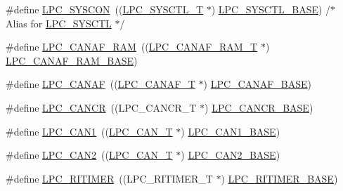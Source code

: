 \begin{DoxyCompactItemize}
\item 
\#define \hyperlink{group__PERIPH__175X__6X__BASE_gabe45c10a979fe812e3d9ecd72fe33a2f}{L\-P\-C\-\_\-\-S\-Y\-S\-C\-O\-N}~((\hyperlink{structLPC__SYSCTL__T}{L\-P\-C\-\_\-\-S\-Y\-S\-C\-T\-L\-\_\-\-T}           $\ast$) \hyperlink{group__PERIPH__407X__8X__BASE_gae4670b50fe27772fa31de1da10bec7b7}{L\-P\-C\-\_\-\-S\-Y\-S\-C\-T\-L\-\_\-\-B\-A\-S\-E}) /$\ast$ Alias for \hyperlink{group__PERIPH__407X__8X__BASE_ga30cc92eba86b30295b3dcf3da503b736}{L\-P\-C\-\_\-\-S\-Y\-S\-C\-T\-L} $\ast$/
\item 
\#define \hyperlink{group__PERIPH__175X__6X__BASE_gaf02b7bcdc41a045910b3f0bae8a8f4b0}{L\-P\-C\-\_\-\-C\-A\-N\-A\-F\-\_\-\-R\-A\-M}~((\hyperlink{structLPC__CANAF__RAM__T}{L\-P\-C\-\_\-\-C\-A\-N\-A\-F\-\_\-\-R\-A\-M\-\_\-\-T}        $\ast$) \hyperlink{group__PERIPH__407X__8X__BASE_ga9d4f2bac61e26b32ad64d62f2be50e49}{L\-P\-C\-\_\-\-C\-A\-N\-A\-F\-\_\-\-R\-A\-M\-\_\-\-B\-A\-S\-E})
\item 
\#define \hyperlink{group__PERIPH__175X__6X__BASE_ga4f738c971938302f38d54e662c9f7774}{L\-P\-C\-\_\-\-C\-A\-N\-A\-F}~((\hyperlink{structLPC__CANAF__T}{L\-P\-C\-\_\-\-C\-A\-N\-A\-F\-\_\-\-T}            $\ast$) \hyperlink{group__PERIPH__407X__8X__BASE_gabc6943f9e943d63ecf4e236b4ce7c344}{L\-P\-C\-\_\-\-C\-A\-N\-A\-F\-\_\-\-B\-A\-S\-E})
\item 
\#define \hyperlink{group__PERIPH__175X__6X__BASE_gadc209557a5736e29149b96018056fc29}{L\-P\-C\-\_\-\-C\-A\-N\-C\-R}~((L\-P\-C\-\_\-\-C\-A\-N\-C\-R\-\_\-\-T            $\ast$) \hyperlink{group__PERIPH__407X__8X__BASE_gac22b88e108d620661add143c174f8f11}{L\-P\-C\-\_\-\-C\-A\-N\-C\-R\-\_\-\-B\-A\-S\-E})
\item 
\#define \hyperlink{group__PERIPH__175X__6X__BASE_ga2f006d6888921f8336dce504eb56f4aa}{L\-P\-C\-\_\-\-C\-A\-N1}~((\hyperlink{structLPC__CAN__T}{L\-P\-C\-\_\-\-C\-A\-N\-\_\-\-T}              $\ast$) \hyperlink{group__PERIPH__407X__8X__BASE_gaf2407c1927ebddd767832aefa74c3398}{L\-P\-C\-\_\-\-C\-A\-N1\-\_\-\-B\-A\-S\-E})
\item 
\#define \hyperlink{group__PERIPH__175X__6X__BASE_ga838776140ad5e0156715278f8bb0652d}{L\-P\-C\-\_\-\-C\-A\-N2}~((\hyperlink{structLPC__CAN__T}{L\-P\-C\-\_\-\-C\-A\-N\-\_\-\-T}              $\ast$) \hyperlink{group__PERIPH__407X__8X__BASE_gab9608b3b72dd843a25910dd2a809106b}{L\-P\-C\-\_\-\-C\-A\-N2\-\_\-\-B\-A\-S\-E})
\item 
\#define \hyperlink{group__PERIPH__175X__6X__BASE_gadf02cb70e7eb1a9e85e2b84ec1537fee}{L\-P\-C\-\_\-\-R\-I\-T\-I\-M\-E\-R}~((L\-P\-C\-\_\-\-R\-I\-T\-I\-M\-E\-R\-\_\-\-T          $\ast$) \hyperlink{group__PERIPH__175X__6X__BASE_ga37e5300b78c57ef9d338291e79610971}{L\-P\-C\-\_\-\-R\-I\-T\-I\-M\-E\-R\-\_\-\-B\-A\-S\-E})

\end{DoxyCompactItemize}
